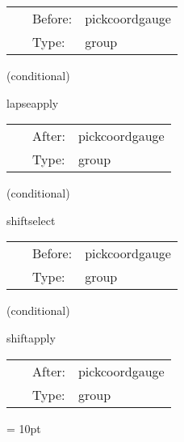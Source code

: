 \hspace{5mm}

 \begin{tabular*}{160mm}{cll} 
~ & Before:  & pickcoordgauge \\ 
~ & Type:  & group \\ 
\end{tabular*} 


\vspace{5mm}

   (conditional) 

\hspace{5mm} lapseapply 

\hspace{5mm}{\it lapse application group } 


\hspace{5mm}

 \begin{tabular*}{160mm}{cll} 
~ & After:  & pickcoordgauge \\ 
~ & Type:  & group \\ 
\end{tabular*} 


\vspace{5mm}

   (conditional) 

\hspace{5mm} shiftselect 

\hspace{5mm}{\it shift selection group } 


\hspace{5mm}

 \begin{tabular*}{160mm}{cll} 
~ & Before:  & pickcoordgauge \\ 
~ & Type:  & group \\ 
\end{tabular*} 


\vspace{5mm}

   (conditional) 

\hspace{5mm} shiftapply 

\hspace{5mm}{\it shift application group } 


\hspace{5mm}

 \begin{tabular*}{160mm}{cll} 
~ & After:  & pickcoordgauge \\ 
~ & Type:  & group \\ 
\end{tabular*} 



\vspace{5mm}\parskip = 10pt 
